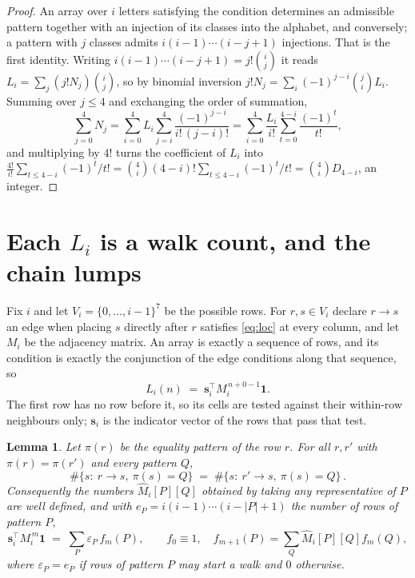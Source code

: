 \documentclass[11pt,a4paper]{article}
\theoremstyle{plain}
\newtheorem{lemma}[theorem]{Lemma}
\theoremstyle{definition}
\begin{document}
\begin{proof}
An array over $i$ letters satisfying the condition determines an admissible pattern together
with an injection of its classes into the alphabet, and conversely; a pattern with $j$
classes admits $i(i-1)\cdots(i-j+1)$ injections. That is the first identity. Writing
$i(i-1)\cdots(i-j+1)=j!\binom{i}{j}$ it reads $L_i=\sum_j (j!N_j)\binom{i}{j}$, so by
binomial inversion $j!N_j=\sum_{i}(-1)^{j-i}\binom{j}{i}L_i$. Summing over
$j\le 4$ and exchanging the order of summation,
\[
\sum_{j=0}^{4}N_j=\sum_{i=0}^{4}L_i\sum_{j=i}^{4}\frac{(-1)^{j-i}}{i!\,(j-i)!}
=\sum_{i=0}^{4}\frac{L_i}{i!}\sum_{t=0}^{4-i}\frac{(-1)^t}{t!} ,
\]
and multiplying by $4!$ turns the coefficient of $L_i$ into
$\frac{4!}{i!}\sum_{t\le 4-i}(-1)^t/t!=\binom{4}{i}(4-i)!\sum_{t\le 4-i}(-1)^t/t!
=\binom{4}{i}D_{4-i}$, an integer.
\end{proof}

\section{Each $L_i$ is a walk count, and the chain lumps}

Fix $i$ and let $V_i=\{0,\dots,i-1\}^{7}$ be the possible rows. For $r,s\in V_i$
declare $r\to s$ an edge when placing $s$ directly after $r$ satisfies \eqref{eq:loc} at
every column, and let $M_i$ be the adjacency matrix. An array is exactly a sequence of
rows, and its condition is exactly the conjunction of the edge conditions along that
sequence, so
\[
L_i(n)\;=\;\mathbf{s}_i^{\!\top}M_i^{\,n+0-1}\mathbf{1} .
\]
The first row has no row before it, so its cells are tested
against their within-row neighbours only; $\mathbf{s}_i$ is the indicator vector of the
rows that pass that test.

\begin{lemma}\label{lem:lump}
Let $\pi(r)$ be the equality pattern of the row $r$. For all $r,r'$ with
$\pi(r)=\pi(r')$ and every pattern $Q$,
\[
\#\{s:\ r\to s,\ \pi(s)=Q\}\;=\;\#\{s:\ r'\to s,\ \pi(s)=Q\}\, .
\]
Consequently the numbers $\widehat M_i[P][Q]$ obtained by taking any representative of $P$
are well defined, and with $e_P=i(i-1)\cdots(i-|P|+1)$ the number of rows of pattern $P$,
\[
\mathbf{s}_i^{\!\top}M_i^{\,m}\mathbf{1}\;=\;\sum_P \varepsilon_P\,f_m(P),
\qquad f_0\equiv1,\quad f_{m+1}(P)=\sum_Q\widehat M_i[P][Q]f_m(Q),
\]
where $\varepsilon_P=e_P$ if rows of pattern $P$ may start a walk and $0$ otherwise.
\end{lemma}
\end{document}
